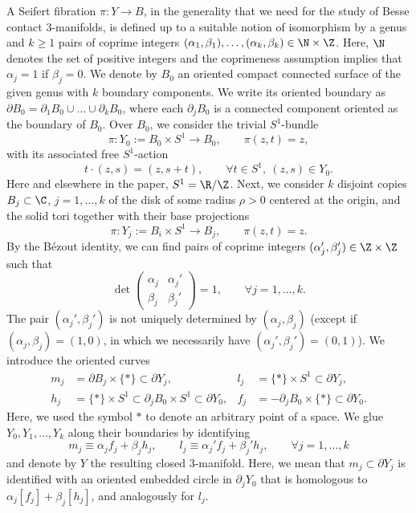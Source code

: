 A Seifert fibration $\pi:Y\to B$, in the generality that we need for the study of Besse contact $3$-manifolds, is defined up to a suitable notion of isomorphism by a genus and $k\geq1$ pairs of coprime integers $(\alpha_1,\beta_1),\dots,(\alpha_k,\beta_k)\in\N\times\Z$. Here, $\N$ denotes the set of positive integers and the coprimeness assumption implies that $\alpha_j=1$ if $\beta_j=0$. We denote by $B_0$ an oriented compact connected surface of the given genus with $k$ boundary components. We write its oriented boundary as $\partial B_0=\partial_1 B_0\cup\dots\cup\partial_{k} B_0$, where each $\partial_j B_0$ is a connected component oriented as the boundary of $B_0$. Over $B_0$, we consider the trivial $S^1$-bundle
\[
\pi:Y_0:=B_0\times S^1\to B_0,\qquad \pi(z,t)=z,
\]
with its associated free $S^1$-action
\[
t\cdot(z,s)=(z,s+t),\qquad \forall t\in S^1,\ (z,s)\in Y_0.
\]
Here and elsewhere in the paper, $S^1=\R/\Z$.
Next, we consider $k$ disjoint copies $B_j\subset \C$, $j=1,\dots,k$ of the disk of some radius $\rho>0$ centered at the origin, and the solid tori together with their base projections
\[
\pi:Y_j:=B_i\times S^1\to B_j,\qquad \pi(z,t)=z.
\]
By the Bézout identity, we can find pairs of coprime integers $(\alpha_j',\beta_j')\in \Z\times \Z$ such that
\begin{equation}
\label{e:dual_Seifert_pair}
\det
\begin{pmatrix}
\alpha_j & \alpha_j' \\
\beta_j & \beta_j'
\end{pmatrix}=1,
\qquad
\forall j=1,\dots,k.
\end{equation}
The pair $(\alpha_j',\beta_j')$ is not uniquely determined by $(\alpha_j,\beta_j)$ (except if $(\alpha_j,\beta_j)=(1,0)$, in which we necessarily have $(\alpha_j',\beta_j') = (0,1)$). We introduce the oriented curves\Changel
\begin{align*}
m_j&=\partial B_j\times\{*\}\subset \partial Y_j,
&
l_j&=\{*\}\times S^1 \subset \partial Y_j,
\\
h_j&=\{*\}\times S^1\subset \partial_j B_0\times S^1 \subset\partial Y_0,
&
f_j&=-\partial_j B_0\times\{*\} \subset\partial Y_0.
\end{align*}
Here, we used the symbol $*$ to denote an arbitrary point of a space. We glue $Y_0,Y_1,\dots,Y_k$ along their boundaries by identifying
\[
m_j\equiv\alpha_jf_j+\beta_j h_j,\qquad l_j\equiv\alpha_j'f_j+\beta_j'h_j,\qquad \forall j=1,\dots,k
\]
and denote by $Y$ the resulting closed $3$-manifold. Here, we mean that $m_j\subset\partial Y_j$ is identified with an oriented embedded circle in $\partial_j Y_0$ that is homologous to $\alpha_j[f_j]+\beta_j[h_j]$, and analogously for $l_j$.
